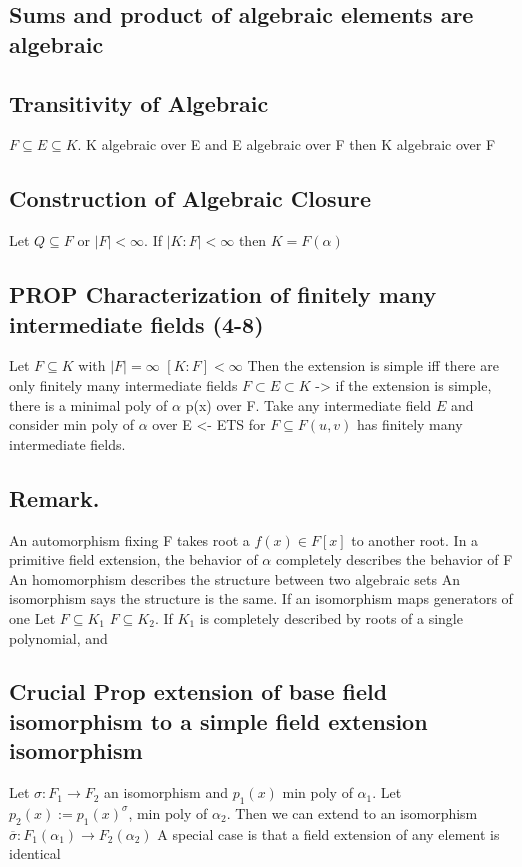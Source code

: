 \documentclass[11pt]{article}
\begin{document}
\subsection{Sums and product of algebraic elements are algebraic}
\label{sec:org77fac7f}
\subsection{Transitivity of Algebraic}
\label{sec:orgb4e1113}
\(F \subseteq E \subseteq K\). K algebraic over E and E algebraic over F then K algebraic over F
\subsection{Construction of Algebraic Closure}
\label{sec:org4d04e23}
Let \(Q \subseteq F\) or \(|F|<\infty\). If \(|K:F|<\infty\) then \(K=F(\alpha)\)
\subsection{\textbf{PROP} Characterization of finitely many intermediate fields (4-8)}
\label{sec:org4eabb3b}
Let \(F \subseteq K\) with \(|F|=\infty\) \([K:F]<\infty\)
Then the extension is simple iff there are only finitely many intermediate fields \(F \subset E \subset K\)
-> if the extension is simple, there is a minimal poly of \(\alpha\) p(x) over F.
Take any intermediate field \(E\) and consider min poly of \(\alpha\) over E
<- ETS for \(F \subseteq F(u,v)\) has finitely many intermediate fields.
\subsection{\textbf{Remark.}}
\label{sec:orgd9d0472}
An automorphism fixing F takes root a \(f(x)\in F[x]\) to another root.
In a primitive field extension, the behavior of \(\alpha\) completely describes the behavior of F
An homomorphism describes the structure between two algebraic sets
An isomorphism says the structure is the same.
If an isomorphism maps generators of one 
Let \(F \subseteq K_1\) \(F \subseteq K_2\). If \(K_1\) is completely described by roots of a single polynomial, and 

\subsection{\textbf{Crucial Prop} extension of base field isomorphism to a simple field extension isomorphism}
\label{sec:orgce4c1ba}
Let \(\sigma : F_1 \rightarrow F_2\) an isomorphism and \(p_1(x)\) min poly of \(\alpha_1\). Let \(p_2(x):=p_1(x)^\sigma\), min poly of \(\alpha_2\). Then we can extend to an isomorphism \(\overline\sigma: F_1(\alpha_1) \rightarrow F_2(\alpha_2)\)
A special case is that a field extension of any element is identical
\end{document}
